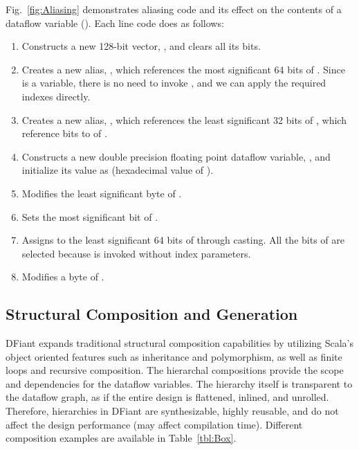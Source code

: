 Fig.~\ref{fig:Aliasing} demonstrates aliasing code and its effect on the contents of a dataflow variable (). Each line code does as follows:
\begin{enumerate}
	\item Constructs a new 128-bit vector, , and clears all its bits.
	\item Creates a new alias, , which references the most significant 64 bits of . Since  is a  variable, there is no need to invoke , and we can apply the required indexes directly.
	\item Creates a new alias, , which references the least significant 32 bits of , which reference bits  to  of .
	\item Constructs a new double precision floating point dataflow variable, , and initialize its value as  (hexadecimal value of ).
	\item Modifies the least significant byte of .
	\item Sets the most significant bit of .
	\item Assigns  to the least significant 64 bits of  through casting. All the bits of  are selected because  is invoked without index parameters.
	\item Modifies a byte of .
	
\end{enumerate}

\subsection{Structural Composition and Generation}
DFiant expands traditional structural composition capabilities by utilizing Scala's object oriented features such as inheritance and polymorphism, as well as finite loops and recursive composition. The hierarchal compositions provide the scope and dependencies for the dataflow variables. The hierarchy itself is transparent to the dataflow graph, as if the entire design is flattened, inlined, and unrolled. Therefore, hierarchies in DFiant are synthesizable, highly reusable, and do not affect the design performance (may affect compilation time). Different composition examples are available in Table~\ref{tbl:Box}.


